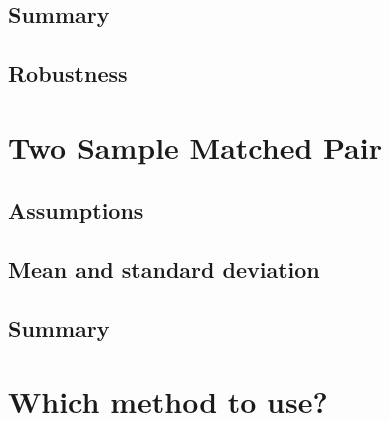\subsection{Summary}  %
\subsection{Robustness}  %

\section{Two Sample Matched Pair}  %
\subsection{Assumptions}  %
\subsection{Mean and standard deviation}  %
\subsection{Summary}  %

\section{Which method to use?}  %
